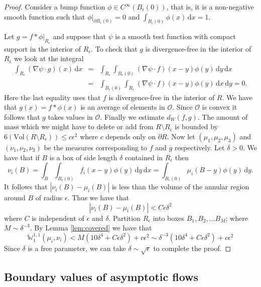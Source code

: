 \documentclass[11pt]{article}
\theoremstyle{remark}
\theoremstyle{definition}
\newcommand{\m}[1]{\mathbb{#1}}
\newcommand{\dd}{\mathrm{d}}
\begin{document}
\begin{proof} 
Consider a bump function $\phi\in C^{\infty}(B_{\epsilon}(0))$, that is, it is a non-negative smooth function such that $\phi|_{\partial B_{\epsilon}(0)}=0$ and $\int_{B_{\epsilon}(0)}\phi(x)\,\dd x=1$.

Let $g= f\ast \phi|_{R_{\epsilon}}$ and suppose that $\psi$ is a smooth test function with compact support in the interior of $R_\epsilon$. To check that $g$ is divergence-free in the interior of $R_\epsilon$ we look at the integral
\begin{eqnarray*}
\int_{R_{\epsilon}}(\nabla\psi\cdot g)(x)\,\dd x&=&
\int_{R_{\epsilon}}\int_{B_\epsilon( 0)}(\nabla\psi\cdot f)(x-y)\phi(y)\,\dd y\,\dd x\\
&=&\int_{B_\epsilon( 0)}\int_{R_{\epsilon}}(\nabla\psi\cdot f)(x-y)\phi(y)\,\dd x\,\dd y=0.
\end{eqnarray*}
Here the last equality uses that $f$ is divergence-free in the interior of $R$. We have that $g(x)=f\ast \phi(x)$ is an average of elements in $\mathcal O$. Since $\mathcal O$ is convex it follows that $g$ takes values in $\mathcal O$. Finally we estimate $d_W(f,g)$. The amount of mass which we might have to delete or add from $R\setminus R_{\epsilon}$ is bounded by
$6(\text{Vol}(R\setminus R_{\epsilon}))\leq c\epsilon^2$ where $c$ depends only on $\partial R$. Now let $(\mu_1, \mu_2, \mu_3)$ and $(\nu_1, \nu_2, \nu_3)$ be the measures corresponding to $f$ and $g$ respectively. Let $\delta>0$. We have that if $B$ is a box of side length $\delta$ contained in $R_{\epsilon}$ then
$$\nu_i(B)=\int_{B}\int_{B_{\epsilon}(0)} f_i(x- y)\phi(y)\,\dd y\,\dd x= \int_{B_{\epsilon}(0)}\mu_i(B-y)\phi(y)\,\dd y.$$
It follows that $|\nu_i(B)-\mu_i(B)|$ is less than the volume of the annular region around $B$ of radius $\epsilon$. Thus we have that
$$|\nu_i(B)-\mu_i(B)|< C\epsilon\delta^2$$ where $C$ is independent of $\epsilon$ and $\delta$. Partition $R_{\epsilon}$ into boxes $B_1, B_2, \ldots B_M$; where $M\sim \delta^{-3}$. By Lemma \ref{lem:covered} we have that
$$\m W^{1,1}_1(\mu_i, \nu_i)< M(10\delta^4 + C \epsilon \delta^2) + c\epsilon^2\sim \delta^{-3}(10\delta^4 + C \epsilon \delta^2) + c\epsilon^2$$
Since $\delta$ is a free parameter, we can take $\delta \sim \sqrt{\epsilon}$ to complete the proof.
\end{proof}

\subsection{Boundary values of asymptotic flows}\label{sec: boundary values of asymptotic flows}
\end{document}
